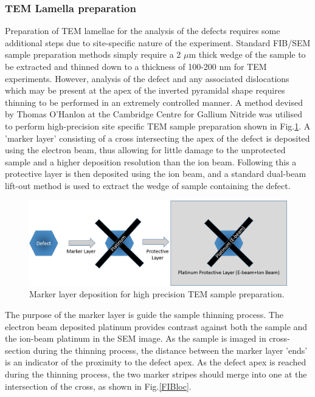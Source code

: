 \subsubsection{TEM Lamella preparation}
\label{FIB marker section}

Preparation of TEM lamellae for the analysis of the defects requires some additional steps due to site-specific nature of the experiment. Standard FIB/SEM sample preparation methods simply require a 2 $\mu$m thick wedge of the sample to be extracted and thinned down to a thickness of 100-200 nm for TEM experiments. However, analysis of the defect and any associated dislocations which may be present at the apex of the inverted pyramidal shape \cite{Watanabe2003,Shiojiri2006} requires thinning to be performed in an extremely controlled manner. A method devised by Thomas O'Hanlon at the Cambridge Centre for Gallium Nitride was utilised to perform high-precision site specific TEM sample preparation shown in Fig.\ref{FIBprep}. A 'marker layer' consisting of a cross intersecting the apex of the defect is deposited using the electron beam, thus allowing for little damage to the unprotected sample and a higher deposition resolution than the ion beam. Following this a protective layer is then deposited using the ion beam, and a standard dual-beam lift-out method is used to extract the wedge of sample containing the defect. 

\begin{figure}[!ht]
	\centering
	\includegraphics[width=1\textwidth]{Figs/Ch3/FIB-spot}
	\caption[h] {Marker layer deposition for high precision TEM sample preparation.}
	\label{FIBprep}
\end{figure}
\FloatBarrier 

The purpose of the marker layer is guide the sample thinning process. The electron beam deposited platinum provides contrast against both the sample and the ion-beam platinum in the SEM image. As the sample is imaged in cross-section during the thinning process, the distance between the marker layer 'ends' is an indicator of the proximity to the defect apex. As the defect apex is reached during the thinning process, the two marker stripes should merge into one at the intersection of the cross, as shown in Fig.\ref{FIBloc}.

